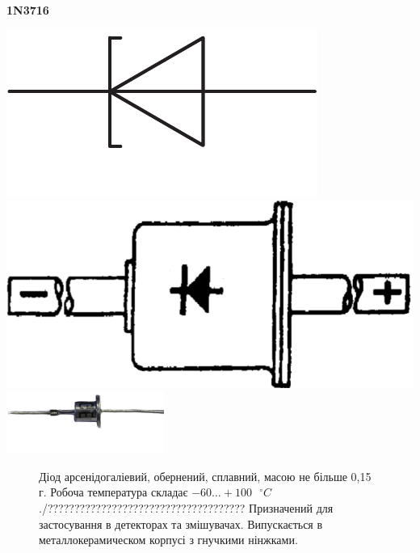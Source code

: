 \documentclass[a4paper,14pt]{extreport}
\begin{document}
\clearpage
\begin{tcolorbox}[colback=white!100,colframe=red!75!black,width=19cm,righttitle=0.5cm,subtitle style={boxrule=0.4pt, colback=yellow!50!red!25!white},title= \bf{Графічне позначення}\hfill  \bf{Натуральне зоображення}]
  \begin{center}\bf{1N3716}\end{center}
  \tcblower
  \includegraphics[scale=0.6]{1.5.1.pdf}\hfill \includegraphics[scale=0.3]{1.5.10.pdf} \hfill\includegraphics[scale=1.5]{1.5.11.pdf}
\end{tcolorbox}
\begin{figure}
\vspace{-0.7 cm}
\parbox{12cm}{%
  \begin{tcolorbox}[width=12cm,right=0.5cm]
  Діод арсенідогаліевий, обернений, сплавний, масою не більше 0,15 г. Робоча температура складає $-60\ldots+100 \text{ }^{ \circ}C$./?????????????????????????????????????
  Призначений для застосування в детекторах та змішувачах.
  Випускається в металлокерамическом корпусі з гнучкими нінжками.


  \end{tcolorbox}}
\end{figure}
\end{document}
